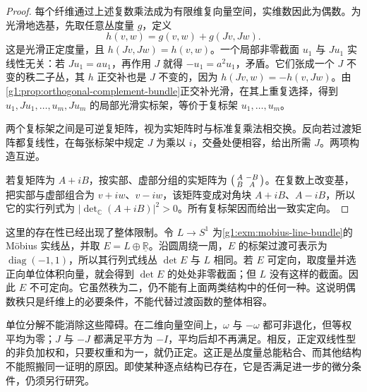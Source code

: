 \begin{proof}
	每个纤维通过上述复数乘法成为有限维复向量空间，实维数因此为偶数。为光滑地选基，先取任意丛度量 \(g\)，定义
	\[
		h(v,w)=g(v,w)+g(Jv,Jw).
	\]
	这是光滑正定度量，且 \(h(Jv,Jw)=h(v,w)\)。一个局部非零截面 \(u_1\) 与 \(Ju_1\) 实线性无关：若 \(Ju_1=a u_1\)，再作用 \(J\) 就得 \(-u_1=a^2u_1\)，矛盾。它们张成一个 \(J\) 不变的秩二子丛，其 \(h\) 正交补也是 \(J\) 不变的，因为 \(h(Jv,w)=-h(v,Jw)\)。由\cref{g1:prop:orthogonal-complement-bundle}正交补光滑，在其上重复选择，得到 \(u_1,Ju_1,\ldots,u_m,Ju_m\) 的局部光滑实标架，等价于复标架 \(u_1,\ldots,u_m\)。

	两个复标架之间是可逆复矩阵，视为实矩阵时与标准复乘法相交换。反向若过渡矩阵都复线性，在每张标架中规定 \(J\) 为乘以 \(i\)，交叠处便相容，给出所需 \(J\)。两项构造互逆。

	若复矩阵为 \(A+iB\)，按实部、虚部分组的实矩阵为 \(\begin{psmallmatrix}A&-B\\B&A\end{psmallmatrix}\)。在复数上改变基，把实部与虚部组合为 \(v+iw\)、\(v-iw\)，该矩阵变成对角块 \(A+iB\)、\(A-iB\)，所以它的实行列式为 \(|\det_{\mathbb C}(A+iB)|^2>0\)。所有复标架因而给出一致实定向。
\end{proof}

这里的存在性已经出现了整体限制。令 \(L\to S^1\) 为\cref{g1:exm:mobius-line-bundle}的 Möbius 实线丛，并取 \(E=L\oplus\underline{\mathbb R}\)。沿圆周绕一周，\(E\) 的标架过渡可表示为 \(\operatorname{diag}(-1,1)\)，所以其行列式线丛 \(\det E\) 与 \(L\) 相同。若 \(E\) 可定向，取度量并选正向单位体积向量，就会得到 \(\det E\) 的处处非零截面；但 \(L\) 没有这样的截面。因此 \(E\) 不可定向。它虽然秩为二，仍不能有上面两类结构中的任何一种。这说明偶数秩只是纤维上的必要条件，不能代替过渡函数的整体相容。

\ProseParagraphBreak

单位分解不能消除这些障碍。在二维向量空间上，\(\omega\) 与 \(-\omega\) 都可非退化，但等权平均为零；\(J\) 与 \(-J\) 都满足平方为 \(-I\)，平均后却不再满足。相反，正定双线性型的非负加权和，只要权重和为一，就仍正定。这正是丛度量总能粘合、而其他结构不能照搬同一证明的原因。即使某种逐点结构已存在，它是否满足进一步的微分条件，仍须另行研究。
